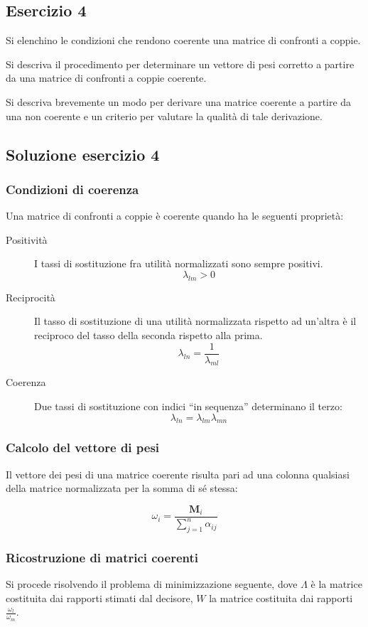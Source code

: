\documentclass[\main/main.tex]{subfiles}
\begin{document}
\subsection{Esercizio 4}
Si elenchino le condizioni che rendono coerente una matrice di confronti a coppie.

Si descriva il procedimento per determinare un vettore di pesi corretto a partire da una matrice di confronti a coppie coerente.

Si descriva brevemente un modo per derivare una matrice coerente a partire da una non coerente e un criterio per valutare la qualità di tale derivazione.

\subsection{Soluzione esercizio 4}
\subsubsection*{Condizioni di coerenza}
Una matrice di confronti a coppie è coerente quando ha le seguenti proprietà:
\begin{description}
  \item[Positività] I tassi di sostituzione fra utilità normalizzati sono sempre positivi.
        \[
          \lambda_{lm} > 0
        \]
  \item[Reciprocità] Il tasso di sostituzione di una utilità normalizzata rispetto ad un'altra è il reciproco del tasso della seconda rispetto alla prima.
        \[
          \lambda_{ln} =  \frac{1}{\lambda_{ml}}
        \]
  \item[Coerenza] Due tassi di sostituzione con indici ``in sequenza'' determinano il terzo:
        \[
          \lambda_{ln} = \lambda_{lm}\lambda_{mn}
        \]
\end{description}

\subsubsection*{Calcolo del vettore di pesi}
Il vettore dei pesi di una matrice coerente risulta pari ad una colonna qualsiasi della matrice normalizzata per la somma di sé stessa:

\[
  \omega_i = \frac{\bm{M}_i}{\sum_{j=1}^n \alpha_{ij}}
\]

\subsubsection*{Ricostruzione di matrici coerenti}
Si procede risolvendo il problema di minimizzazione seguente, dove $\Lambda$ è la matrice costituita dai rapporti stimati dal decisore, $W$ la matrice costituita dai rapporti $\frac{\omega_l}{\omega_m}$.
\end{document}
